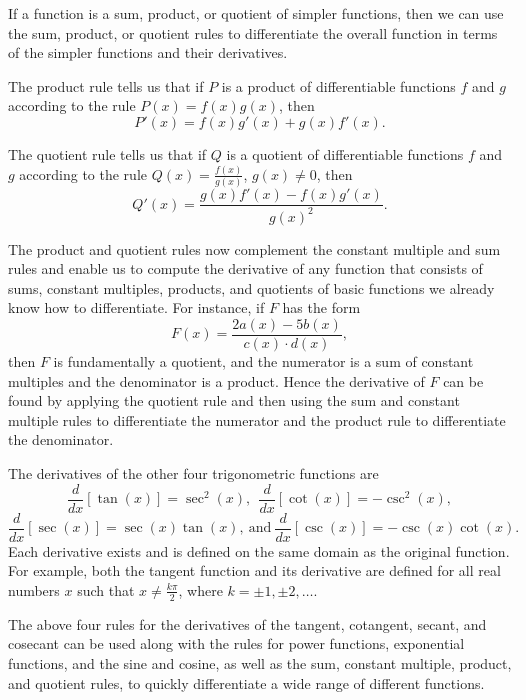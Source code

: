 \begin{summary}
\item If a function is a sum, product, or quotient of simpler functions, then we can use the sum, product, or quotient rules to differentiate the overall function in terms of the simpler functions and their derivatives.  
\item The product rule tells us that if $P$ is a product of differentiable functions $f$ and $g$ according to the rule $P(x) = f(x) g(x)$, then 
$$P'(x) = f(x)g'(x) + g(x)f'(x).$$
\item The quotient rule tells us that if $Q$ is a quotient of differentiable functions $f$ and $g$ according to the rule $Q(x) = \frac{f(x)}{g(x)}$, $g(x) \ne 0$, then 
$$Q'(x) = \frac{g(x)f'(x) - f(x)g'(x)}{g(x)^2}.$$
\item The product and quotient rules now complement the constant multiple and sum rules and enable us to compute the derivative of any function that consists of sums, constant multiples, products, and quotients of basic functions we already know how to differentiate.  For instance, if $F$ has the form
$$F(x) = \frac{2a(x) - 5b(x)}{c(x) \cdot d(x)},$$
then $F$ is fundamentally a quotient, and the numerator is a sum of constant multiples and the denominator is a product.  Hence the derivative of $F$ can be found by applying the quotient rule and then using the sum and constant multiple rules to differentiate the numerator and the product rule to differentiate the denominator.
\item The derivatives of the other four trigonometric functions are
$$\frac{d}{dx}[\tan(x)] = \sec^2(x), \ \ \frac{d}{dx}[\cot(x)] = -\csc^2(x),$$ 
$$\frac{d}{dx}[\sec(x)] = \sec(x)\tan(x), \ \mbox{and} \ \frac{d}{dx}[\csc(x)] = -\csc(x)\cot(x).$$
Each derivative exists and is defined on the same domain as the original function.  For example, both the tangent function and its derivative are defined for all real numbers $x$ such that $x \ne \frac{k\pi}{2}$, where $k = \pm 1, \pm 2, \ldots$.
\item The above four rules for the derivatives of the tangent, cotangent, secant, and cosecant can be used along with the rules for power functions, exponential functions, and the sine and cosine, as well as the sum, constant multiple, product, and quotient rules, to quickly differentiate a wide range of different functions.
\end{summary}

\clearpage

 

\cleardoublepage